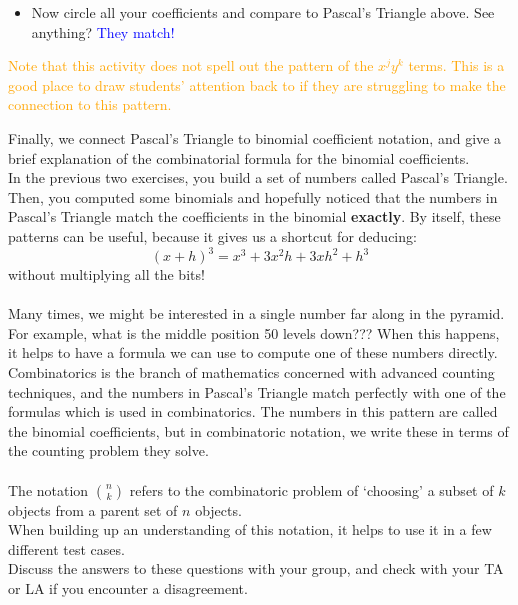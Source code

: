 \documentclass{ximera}
\begin{document}
\begin{exercise}
\begin{enumerate}
\begin{itemize}
{\begin{center}
                $(x+y)^3=1x^3+3x^2y+3xy^2+1y^3$
            \end{center}}
            \item Now circle all your coefficients and compare to Pascal's Triangle above.  See anything? 
            \textcolor{blue}{They match!}
        \end{itemize}
        \textcolor{orange}{Note that this activity does not spell out the pattern of the $x^jy^k$ terms. This is a good place to draw students' attention back to if they are struggling to make the connection to this pattern. }
    \end{enumerate}
\end{exercise}

\begin{exercise}
    Finally, we connect Pascal's Triangle to binomial coefficient notation, and give a brief explanation of the combinatorial formula for the binomial coefficients.  \\
    In the previous two exercises, you build a set of numbers called Pascal's Triangle.  Then, you computed some binomials and hopefully noticed that the numbers in Pascal's Triangle match the coefficients in the binomial \textbf{exactly}.  By itself, these patterns can be useful, because it gives us a shortcut for deducing:
    \[(x+h)^3=x^3+3x^2h+3xh^2+h^3\]
    without multiplying all the bits! \\
    \\
    Many times, we might be interested in a single number far along in the pyramid. For example, what is the middle position 50 levels down??? When this happens, it helps to have a formula we can use to compute one of these numbers directly.  Combinatorics is the branch of mathematics concerned with advanced counting techniques, and the numbers in Pascal's Triangle match perfectly with one of the formulas which is used in combinatorics.  The numbers in this pattern are called the binomial coefficients, but in combinatoric notation, we write these in terms of the counting problem they solve. \\
    \\
    The notation ${n \choose k}$ refers to the combinatoric problem of `choosing' a subset of $k$ objects from a parent set of $n$ objects.\\
    When building up an understanding of this notation, it helps to use it in a few different test cases. \\
    Discuss the answers to these questions with your group, and check with your TA or LA if you encounter a disagreement.

\end{exercise}
\end{document}
